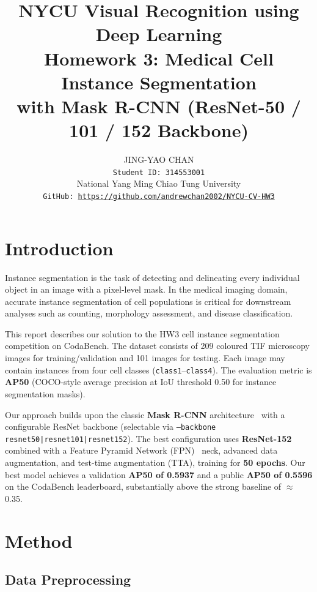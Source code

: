 \documentclass[11pt]{article}
\title{%
  \textbf{NYCU Visual Recognition using Deep Learning}\\
  \large Homework 3: Medical Cell Instance Segmentation\\
  with Mask R-CNN (ResNet-50 / 101 / 152 Backbone)
}
\author{
  JING-YAO CHAN\\
  \texttt{Student ID: 314553001}\\
  National Yang Ming Chiao Tung University\\
  \texttt{GitHub: \url{https://github.com/andrewchan2002/NYCU-CV-HW3}}
}
\begin{document}
\maketitle

\section{Introduction}

Instance segmentation is the task of detecting and delineating every
individual object in an image with a pixel-level mask. In the medical
imaging domain, accurate instance segmentation of cell populations is
critical for downstream analyses such as counting, morphology assessment,
and disease classification.

This report describes our solution to the HW3 cell instance segmentation
competition on CodaBench. The dataset consists of 209 coloured TIF
microscopy images for training/validation and 101 images for testing.
Each image may contain instances from four cell classes
(\texttt{class1}--\texttt{class4}). The evaluation metric is
\textbf{AP50} (COCO-style average precision at IoU threshold 0.50 for
instance segmentation masks).

Our approach builds upon the classic \textbf{Mask R-CNN}
architecture~\cite{he2017mask} with a configurable ResNet backbone
(selectable via \texttt{--backbone resnet50|resnet101|resnet152}).
The best configuration uses \textbf{ResNet-152}~\cite{he2016deep}
combined with a Feature Pyramid Network (FPN)~\cite{lin2017feature}
neck, advanced data augmentation, and test-time augmentation (TTA),
training for \textbf{50 epochs}. Our best model achieves a validation
\textbf{AP50 of 0.5937} and a public \textbf{AP50 of 0.5596} on the
CodaBench leaderboard, substantially above the strong baseline of
$\approx$0.35.

\section{Method}

\subsection{Data Preprocessing}
\end{document}
